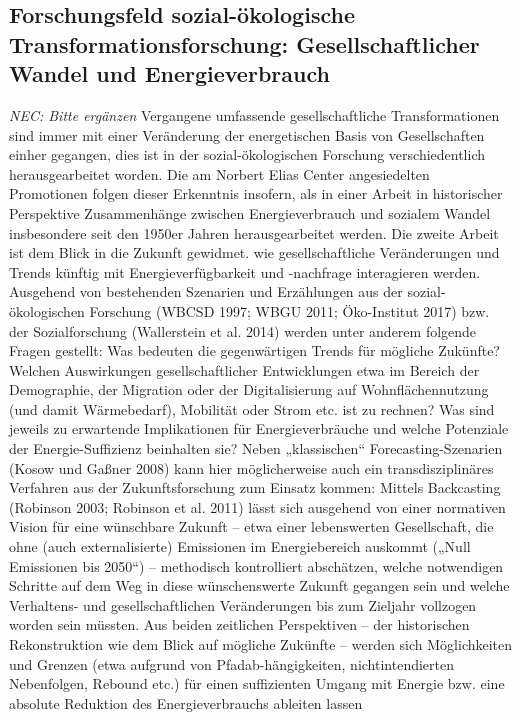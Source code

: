 \documentclass[a4paper,11pt,twoside]{scrartcl}
\begin{document}
\subsection*{Forschungsfeld sozial-ökologische Transformationsforschung: Gesellschaftlicher Wandel und Energieverbrauch}
\textit{NEC: Bitte ergänzen}
Vergangene umfassende gesellschaftliche Transformationen sind immer mit einer Veränderung der energetischen Basis von Gesellschaften einher gegangen, dies ist in der sozial-ökologischen Forschung verschiedentlich herausgearbeitet worden. Die am Norbert Elias Center angesiedelten Promotionen folgen dieser Erkenntnis insofern, als in einer Arbeit in historischer Perspektive Zusammenhänge zwischen Energieverbrauch und sozialem Wandel insbesondere seit den 1950er Jahren herausgearbeitet werden. Die zweite Arbeit ist dem Blick in die Zukunft gewidmet. wie gesellschaftliche Veränderungen und Trends künftig mit Energieverfügbarkeit und -nachfrage interagieren werden. Ausgehend von bestehenden Szenarien und Erzählungen aus der sozial-ökologischen Forschung (WBCSD 1997; WBGU 2011; Öko-Institut 2017) bzw. der Sozialforschung (Wallerstein et al. 2014) werden unter anderem folgende Fragen gestellt: Was bedeuten die gegenwärtigen Trends für mögliche Zukünfte? Welchen Auswirkungen gesellschaftlicher Entwicklungen etwa im Bereich der Demographie, der Migration oder der Digitalisierung auf Wohnflächennutzung (und damit Wärmebedarf), Mobilität oder Strom etc. ist zu rechnen? Was sind jeweils zu erwartende Implikationen für Energieverbräuche und welche Potenziale der Energie-Suffizienz beinhalten sie? Neben „klassischen“ Forecasting-Szenarien (Kosow und Gaßner 2008) kann hier möglicherweise auch ein transdisziplinäres Verfahren aus der Zukunftsforschung zum Einsatz kommen: Mittels Backcasting (Robinson 2003; Robinson et al. 2011) lässt sich ausgehend von einer normativen Vision für eine wünschbare Zukunft – etwa einer lebenswerten Gesellschaft, die ohne (auch externalisierte) Emissionen im Energiebereich auskommt („Null Emissionen bis 2050“) – methodisch kontrolliert abschätzen, welche notwendigen Schritte auf dem Weg in diese wünschenswerte Zukunft gegangen sein und welche Verhaltens- und gesellschaftlichen Veränderungen bis zum Zieljahr vollzogen worden sein müssten. 
Aus beiden zeitlichen Perspektiven – der historischen Rekonstruktion wie dem Blick auf mögliche Zukünfte – werden sich Möglichkeiten und Grenzen (etwa aufgrund von Pfadab-hängigkeiten, nichtintendierten Nebenfolgen, Rebound etc.) für einen suffizienten Umgang mit Energie bzw. eine absolute Reduktion des Energieverbrauchs ableiten lassen  
\end{document}
